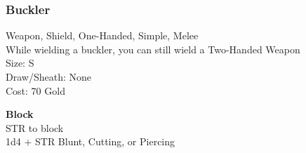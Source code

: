 \subsubsection{Buckler}\label{weapon:buckler}
Weapon, Shield, One-Handed, Simple, Melee\\
While wielding a buckler, you can still wield a Two-Handed Weapon\\
Size: S\\
Draw/Sheath: None\\
Cost: 70 Gold

\textbf{Block}\\
STR to block\\
1d4 + \texttimes STR Blunt, Cutting, or Piercing

